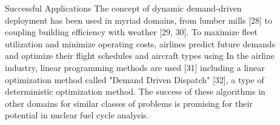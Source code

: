 \documentclass[final]{beamer}
\newlength{\sepwid}
\newlength{\onecolwid}
\newlength{\twocolwid}
\begin{document}
\begin{frame}[t]
\begin{columns}[t]
\begin{column}{\twocolwid}
\begin{columns}[t,totalwidth=\twocolwid]
\begin{column}{\onecolwid}

\begin{block}{Successful Applications}
The concept of dynamic demand-driven deployment has been used in myriad domains, 
from lumber mills [28] to coupling building efficiency with weather [29, 30].  
To maximize fleet utilization and minimize operating costs, airlines predict future 
demands and optimize their flight schedules and aircraft types using In the airline industry, 
linear programming methods are used [31] including a linear optimization method called 
"Demand Driven Dispatch" [32], a type of deterministic optimization method.
The success of these algorithms in other domains for similar classes 
of problems is promising for their potential in nuclear fuel cycle analysis.

\end{block}


\end{column} %

\end{columns} %

\end{column} %

\begin{column}{\sepwid}\end{column} %

\begin{column}{\onecolwid} %



\end{column}
\end{columns}
\end{frame}
\end{document}
